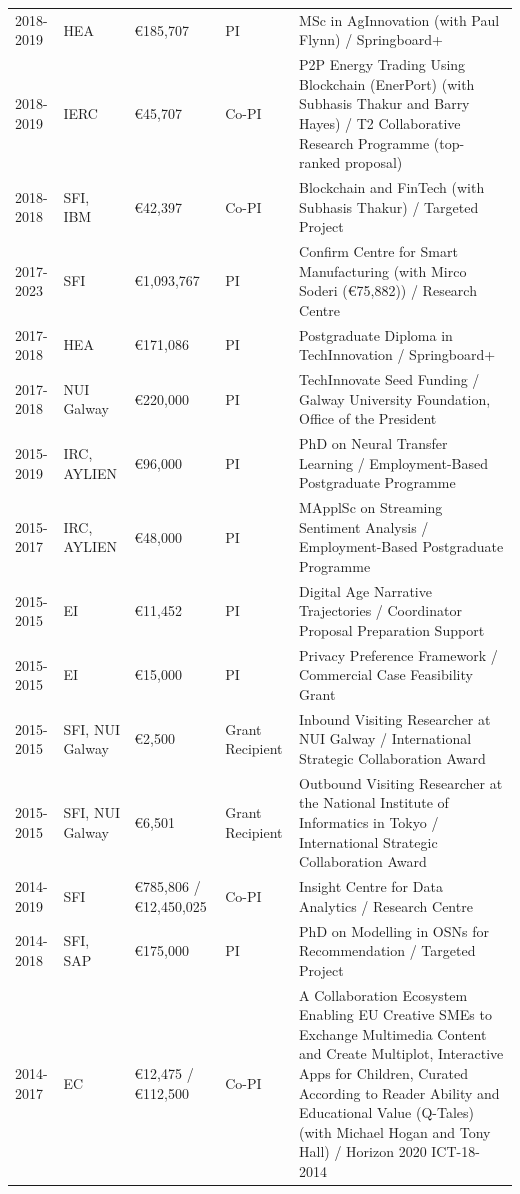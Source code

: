 \documentclass[10pt,a4paper]{res} %
\begin{document}
\begin{resume}
\begin{longtable}{ p{2 cm} | p{2 cm} | p{2 cm} | p{2 cm} | p{7 cm} }
2018-2019 & HEA & \euro{}185,707 & PI & MSc in AgInnovation (with Paul Flynn) / Springboard+ \\
2018-2019 & IERC & \euro{}45,707 & Co-PI & P2P Energy Trading Using Blockchain (EnerPort) (with Subhasis Thakur and Barry Hayes) / T2 Collaborative Research Programme (top-ranked proposal) \\
2018-2018 & SFI, IBM & \euro{}42,397 & Co-PI & Blockchain and FinTech (with Subhasis Thakur) / Targeted Project \\
2017-2023 & SFI & \euro{}1,093,767 & PI & Confirm Centre for Smart Manufacturing (with Mirco Soderi (€75,882)) / Research Centre \\
2017-2018 & HEA & \euro{}171,086 & PI & Postgraduate Diploma in TechInnovation / Springboard+ \\
2017-2018 & NUI Galway & \euro{}220,000 & PI & TechInnovate Seed Funding / Galway University Foundation, Office of the President \\
2015-2019 & IRC, AYLIEN & \euro{}96,000 & PI & PhD on Neural Transfer Learning / Employment-Based Postgraduate Programme \\
2015-2017 & IRC, AYLIEN & \euro{}48,000 & PI & MApplSc on Streaming Sentiment Analysis / Employment-Based Postgraduate Programme \\
2015-2015 & EI & \euro{}11,452 & PI & Digital Age Narrative Trajectories / Coordinator Proposal Preparation Support \\
2015-2015 & EI & \euro{}15,000 & PI & Privacy Preference Framework / Commercial Case Feasibility Grant \\
2015-2015 & SFI, NUI Galway & \euro{}2,500 & Grant Recipient & Inbound Visiting Researcher at NUI Galway / International Strategic Collaboration Award \\
2015-2015 & SFI, NUI Galway & \euro{}6,501 & Grant Recipient & Outbound Visiting Researcher at the National Institute of Informatics in Tokyo / International Strategic Collaboration Award \\
2014-2019 & SFI & \euro{}785,806 / \euro{}12,450,025 & Co-PI & Insight Centre for Data Analytics / Research Centre \\
2014-2018 & SFI, SAP & \euro{}175,000 & PI & PhD on Modelling in OSNs for Recommendation / Targeted Project \\
2014-2017 & EC & \euro{}12,475 / \euro{}112,500 & Co-PI & A Collaboration Ecosystem Enabling EU Creative SMEs to Exchange Multimedia Content and Create Multiplot, Interactive Apps for Children, Curated According to Reader Ability and Educational Value (Q-Tales) (with Michael Hogan and Tony Hall) / Horizon 2020 ICT-18-2014 \\

\end{longtable}
\end{resume}
\end{document}
